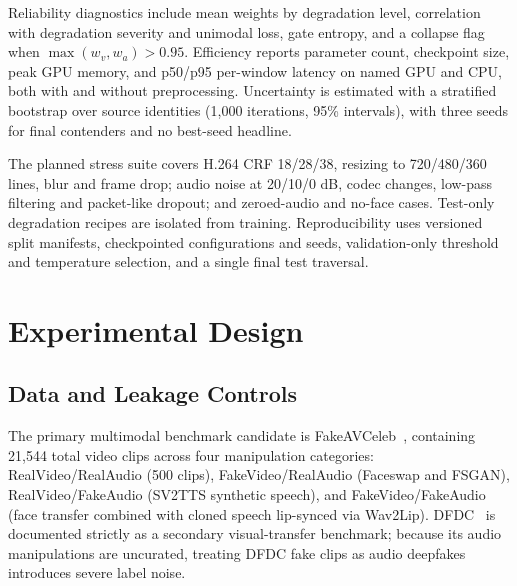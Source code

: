 \documentclass[conference]{IEEEtran}
\begin{document}
Reliability diagnostics include mean weights by degradation level, correlation with degradation severity and unimodal loss, gate entropy, and a collapse flag when $\max(w_v,w_a)>0.95$. Efficiency reports parameter count, checkpoint size, peak GPU memory, and p50/p95 per-window latency on named GPU and CPU, both with and without preprocessing. Uncertainty is estimated with a stratified bootstrap over source identities (1,000 iterations, 95\% intervals), with three seeds for final contenders and no best-seed headline.

The planned stress suite covers H.264 CRF 18/28/38, resizing to 720/480/360 lines, blur and frame drop; audio noise at 20/10/0 dB, codec changes, low-pass filtering and packet-like dropout; and zeroed-audio and no-face cases. Test-only degradation recipes are isolated from training. Reproducibility uses versioned split manifests, checkpointed configurations and seeds, validation-only threshold and temperature selection, and a single final test traversal.

\section{Experimental Design}

\subsection{Data and Leakage Controls}
The primary multimodal benchmark candidate is FakeAVCeleb~\cite{khalid2021}, containing 21,544 total video clips across four manipulation categories: RealVideo\slash RealAudio (500 clips), FakeVideo\slash RealAudio (Faceswap and FSGAN), RealVideo\slash FakeAudio (SV2TTS synthetic speech), and FakeVideo\slash FakeAudio (face transfer combined with cloned speech lip-synced via Wav2Lip). DFDC~\cite{dolhansky2020} is documented strictly as a secondary visual-transfer benchmark; because its audio manipulations are uncurated, treating DFDC fake clips as audio deepfakes introduces severe label noise.
\end{document}
